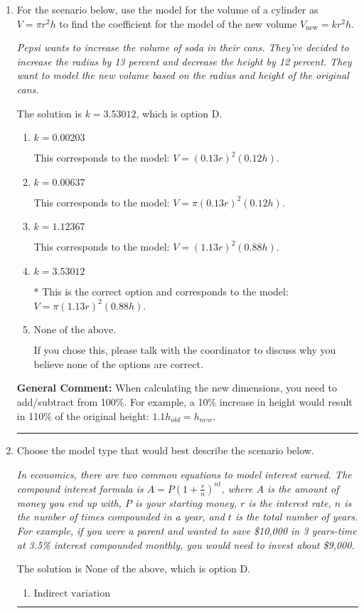 \documentclass{extbook}[14pt]
\newcommand{\litem}[1]{\item #1

\rule{\textwidth}{0.4pt}}
\begin{document}
\begin{enumerate}\litem{
For the scenario below, use the model for the volume of a cylinder as $V = \pi r^2 h$ to find the coefficient for the model of the new volume $V_{\text{new}} = k r^2 h$.

\begin{center}
    \textit{ Pepsi wants to increase the volume of soda in their cans. They've decided to increase the radius by 13 percent and decrease the height by 12 percent. They want to model the new volume based on the radius and height of the original cans. }
\end{center}
The solution is \( k = 3.53012 \), which is option D.\begin{enumerate}[label=\Alph*.]
\item \( k = 0.00203 \)

This corresponds to the model: $V = (0.13 r)^2 (0.12 h)$.
\item \( k = 0.00637 \)

This corresponds to the model: $V = \pi (0.13 r)^2 (0.12 h)$.
\item \( k = 1.12367 \)

This corresponds to the model: $V = (1.13 r)^2 (0.88 h)$.
\item \( k = 3.53012 \)

* This is the correct option and corresponds to the model: $V = \pi (1.13 r)^2 (0.88 h)$.
\item \( \text{None of the above.} \)

If you chose this, please talk with the coordinator to discuss why you believe none of the options are correct.
\end{enumerate}

\textbf{General Comment:} When calculating the new dimensions, you need to add/subtract from 100\%. For example, a 10\% increase in height would result in 110\% of the original height: $1.1h_{old} = h_{new}$.
}
\litem{
Choose the model type that would best describe the scenario below.

\begin{center}
    \textit{ In economics, there are two common equations to model interest earned. The compound interest formula is $A = P (1 + \frac{r}{n})^{nt}$, where $A$ is the amount of money you end up with, $P$ is your starting money, $r$ is the interest rate, $n$ is the number of times compounded in a year, and $t$ is the total number of years. For example, if you were a parent and wanted to save \$10,000 in 3 years-time at 3.5\% interest compounded monthly, you would need to invest about \$9,000. }
\end{center}
The solution is \( \text{None of the above} \), which is option D.\begin{enumerate}[label=\Alph*.]
\item \( \text{Indirect variation} \)



\end{enumerate}}
\end{enumerate}
\end{document}
